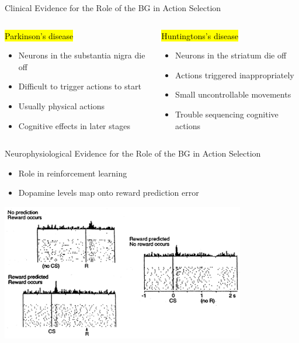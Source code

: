 \documentclass[handout,aspectratio=169]{beamer}
\begin{document}
	\begin{frame}{Clinical Evidence for the Role of the BG in Action Selection}
		\begin{columns}[t]
			\begin{block}{\hl{Parkinson's disease}}
				\begin{itemize}			
					\setlength{\itemsep}{0.5cm}
					\item Neurons in the substantia nigra die off
					\item Difficult to trigger actions to start
					\item Usually physical actions
					\item Cognitive effects in later stages
				\end{itemize}
			\end{block}
			\begin{block}{\hl{Huntingtons's disease}}
				\begin{itemize}			
					\setlength{\itemsep}{0.5cm}
					\item Neurons in the striatum die off
					\item Actions triggered inappropriately
					\item Small uncontrollable movements
					\item Trouble sequencing cognitive actions					
				\end{itemize}
			\end{block}
		\end{columns}
	\end{frame}

	\begin{frame}{Neurophysiological Evidence for the Role of the BG in Action Selection}
		\begin{multicols}{2}
		\begin{itemize}
			\setlength{\itemsep}{0.25cm}
			\item Role in reinforcement learning
			\item Dopamine levels map onto reward prediction error
		\end{itemize}
		\end{multicols}
		\centering
		\includegraphics[width=0.8\textwidth]{media/dopamine.png}
	\end{frame}
\end{document}
